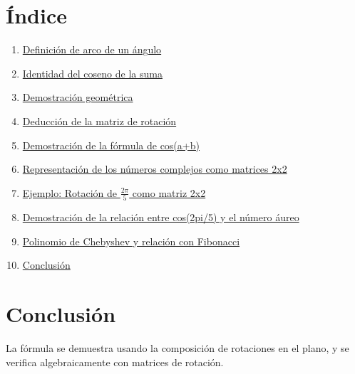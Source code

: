 \documentclass{article}
\begin{document}
\section*{Índice}
\begin{enumerate}
  \item \hyperref[sec:arco]{Definición de arco de un ángulo}
  \item \hyperref[sec:identidad]{Identidad del coseno de la suma}
  \item \hyperref[sec:geom]{Demostración geométrica}
  \item \hyperref[sec:rotacion]{Deducción de la matriz de rotación}
  \item \hyperref[sec:demcos]{Demostración de la fórmula de cos(a+b)}
  \item \hyperref[sec:complejos]{Representación de los números complejos como matrices 2x2}
  \item \hyperref[sec:ejemplo]{Ejemplo: Rotación de $\frac{2\pi}{5}$ como matriz 2x2}
  \item \hyperref[sec:cosenoaureo]{Demostración de la relación entre cos(2pi/5) y el número áureo}
  \item \hyperref[sec:chebfib]{Polinomio de Chebyshev y relación con Fibonacci}
  \item \hyperref[sec:conclusion]{Conclusión}
\end{enumerate}


\pagecolor{carne}

\newpage

\pagecolor{white}

\newpage

\pagecolor{carne}

\newpage

\pagecolor{white}

\newpage

\pagecolor{carne}

\newpage

\pagecolor{white}

\newpage

\pagecolor{carne}

\newpage

\pagecolor{white}

\newpage

\pagecolor{carne}

\newpage

\pagecolor{white}
\section{Conclusión}\label{sec:conclusion}
La fórmula se demuestra usando la composición de rotaciones en el plano, y se verifica algebraicamente con matrices de rotación.
\end{document}
